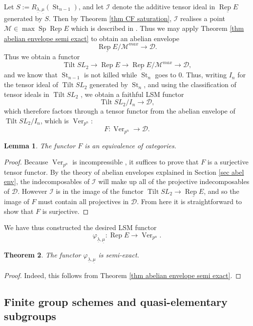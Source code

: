 \documentclass[11pt]{amsart}
\def\MM{\mathcal{M}}
\def\II{\mathcal{I}}
\def\Ds{\mathscr{D}}
\def\Rep{\operatorname{Rep}}
\def\Ver{\operatorname{Ver}}
\def\ul{\underline}
\def\Sp{\operatorname{Sp}}
\newtheorem{thm}{Theorem}[section]
\newtheorem{lemma}[thm]{Lemma}
\theoremstyle{definition}
\theoremstyle{remark}
\numberwithin{equation}{section}
\begin{document}
Let $S:=R_{\underline{\lambda},\underline{\mu}}(\operatorname{St}_{n-1})$, and let $\II$ denote the additive tensor ideal in $\ul{\Rep E}$ generated by $S$.  Then by Theorem \ref{thm CF saturation}, $\II$ realises a point $\MM\in\max\Sp\ul{\Rep E}$ which is described in \cite[Cor.~4.2.7]{CF3}.  Thus we may apply Theorem \ref{thm abelian envelope semi exact} to obtain an abelian envelope
\[
\ul{\Rep E}/\MM^{max}\to \Ds.
\]
Thus we obtain a functor
\[
\operatorname{Tilt}SL_2\to\Rep E\to \ul{\Rep E}/\MM^{max}\to \Ds,
\]
and we know that $\operatorname{St}_{n-1}$ is not killed while $\operatorname{St}_{n}$ goes to 0.  Thus, writing $I_n$ for the tensor ideal of $\operatorname{Tilt}SL_2$ generated by $\operatorname{St}_n$, and using the classification of tensor ideals in $\operatorname{Tilt}SL_2$ \cite{C}, we obtain a faithful LSM functor
\[
\operatorname{Tilt}SL_2/I_n\to \Ds,
\]
which therefore factors through a tensor functor from the abelian envelope of $\operatorname{Tilt}SL_2/I_n$, which is $\Ver_{p^n}$:
\[
F:\Ver_{p^n}\to\Ds.
\]

\begin{lemma}
    The functor $F$ is an equivalence of categories.
\end{lemma}
\begin{proof}
    Because $\Ver_{p^n}$ is incompressible \cite{BEO}, it suffices to prove that $F$ is a surjective tensor functor.  By the theory of abelian envelopes explained in Section \ref{sec abel env}, the indecomposables of $\II$ will make up all of the projective indecomposables of $\Ds$.  However $\II$ is in the image of the functor $\operatorname{Tilt}SL_2\to\ul{\Rep E}$, and so the image of $F$ must contain all projectives in $\Ds$.  From here it is straightforward to show that $F$ is surjective. 
\end{proof}

We have thus constructed the desired LSM functor
\[
\varphi_{\underline{\lambda},\underline{\mu}}:\Rep E\to\Ver_{p^n}.
\]
  
\begin{thm}\label{thm 3}
   The functor $\varphi_{\underline{\lambda},\underline{\mu}}$ is semi-exact.
\end{thm}

\begin{proof}
    Indeed, this follows from Theorem \ref{thm abelian envelope semi exact}.
\end{proof}


\subsection{Finite group schemes and quasi-elementary subgroups}
\end{document}
